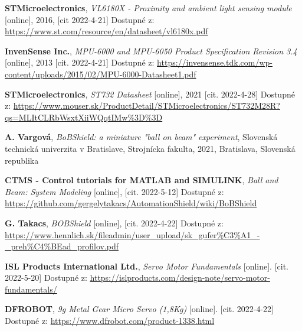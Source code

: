\documentclass[12pt,fleqn,a4paper,oneside]{mybook} %
\theoremstyle{definition}
\begin{document}
	
	
	
	
	
	
	\tableofcontents
	\thispagestyle{empty}
	\cleardoublepage
	
	\pagestyle{plain}
	\setcounter{page}{1}
	
	
	
	
	
	
	
	
	
	
	\begin{thebibliography}{10}
	\textbf{STMicroelectronics}, \textit{VL6180X - Proximity and ambient light sensing module} [online], 2016, [cit 2022-4-21] Dostupné z: \url{https://www.st.com/resource/en/datasheet/vl6180x.pdf } 
	
	\textbf{InvenSense Inc.}, \textit{MPU-6000 and MPU-6050 Product Specification Revision 3.4} [online], 2013 [cit. 2022-4-21] Dostupné z:
	\url{https://invensense.tdk.com/wp-content/uploads/2015/02/MPU-6000-Datasheet1.pdf}
	
	\textbf{STMicroelectronics}, \textit{ST732 Datasheet} [online], 2021 [cit. 2022-4-28] Dostupné z:
	\url{https://www.mouser.sk/ProductDetail/STMicroelectronics/ST732M28R?qs=MLItCLRbWsxtXiiWQqtIMw%3D%3D}
	
	\textbf{A. Vargová}, \textit{BoBShield: a miniature "ball on beam" experiment}, Slovenská technická univerzita v Bratislave, Strojnícka fakulta, 2021, Bratislava, Slovenská republika
	
	
	\textbf{CTMS - Control tutorials for MATLAB and SIMULINK}, \textit{Ball and Beam: System Modeling} [online], [cit. 2022-5-12] Dostupné z:
	\url{https://github.com/gergelytakacs/AutomationShield/wiki/BoBShield}
	
	
	\textbf{G. Takacs}, \textit{BOBShield} [online], [cit. 2022-4-22] Dostupné z:
	\url{https://www.hennlich.sk/fileadmin/user_upload/sk_gufer%C3%A1_-_preh%C4%BEad_profilov.pdf}
	
	
	\textbf{ISL Products International Ltd.}, \textit{Servo Motor Fundamentals} [online]. [cit. 2022-5-20] Dostupné z:
	\url{https://islproducts.com/design-note/servo-motor-fundamentals/}
	
	\textbf{DFROBOT}, \textit{9g Metal Gear Micro Servo (1,8Kg)} [online]. [cit. 2022-4-22] Dostupné z:
	\url{https://www.dfrobot.com/product-1338.html}
	

\end{thebibliography}
\end{document}
